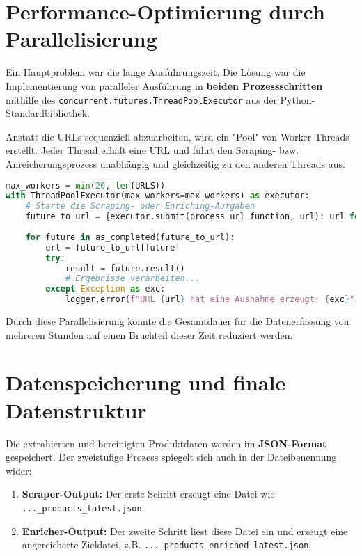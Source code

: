 \documentclass[12pt, a4paper]{report} %
\begin{document}
\section{Performance-Optimierung durch Parallelisierung}
\label{sec:scraping_performance}
Ein Hauptproblem war die lange Ausführungszeit. Die Lösung war die Implementierung von paralleler Ausführung in \textbf{beiden Prozessschritten} mithilfe des \texttt{concurrent.futures.ThreadPoolExecutor} aus der Python-Standardbibliothek.

Anstatt die URLs sequenziell abzuarbeiten, wird ein "Pool" von Worker-Threads erstellt. Jeder Thread erhält eine URL und führt den Scraping- bzw. Anreicherungsprozess unabhängig und gleichzeitig zu den anderen Threads aus.

\begin{lstlisting}[language=Python, caption={Parallele Ausführung mit ThreadPoolExecutor}]
max_workers = min(20, len(URLS))
with ThreadPoolExecutor(max_workers=max_workers) as executor:
    # Starte die Scraping- oder Enriching-Aufgaben
    future_to_url = {executor.submit(process_url_function, url): url for url in URLS}
    
    for future in as_completed(future_to_url):
        url = future_to_url[future]
        try:
            result = future.result()
            # Ergebnisse verarbeiten...
        except Exception as exc:
            logger.error(f"URL {url} hat eine Ausnahme erzeugt: {exc}")
\end{lstlisting}
Durch diese Parallelisierung konnte die Gesamtdauer für die Datenerfassung von mehreren Stunden auf einen Bruchteil dieser Zeit reduziert werden.

\section{Datenspeicherung und finale Datenstruktur}
\label{sec:scraping_datenspeicherung}
Die extrahierten und bereinigten Produktdaten werden im \textbf{JSON-Format} gespeichert. Der zweistufige Prozess spiegelt sich auch in der Dateibenennung wider:
\begin{enumerate}
    \item \textbf{Scraper-Output:} Der erste Schritt erzeugt eine Datei wie \texttt{..._products_latest.json}.
    \item \textbf{Enricher-Output:} Der zweite Schritt liest diese Datei ein und erzeugt eine angereicherte Zieldatei, z.B. \texttt{..._products_enriched_latest.json}.
\end{enumerate}
\end{document}
